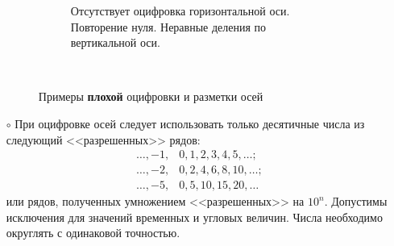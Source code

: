 \begin{itemize}
\begin{figure}
\begin{subfigure}[t]{0.46\tw}
        \caption{Отсутствует оцифровка горизонтальной оси. Повторение нуля. Неравные деления по вертикальной оси.}
    \end{subfigure}
    \hfill\!\!\!~
    \caption{Примеры {\bfseries плохой} оцифровки и разметки осей}
\end{figure}
    
    \item[$\circ$] При оцифровке осей следует использовать только десятичные числа из следующий <<разрешенных>> рядов:
    \begin{align*}
        \ldots,-1,&0,1,2,3,4,5,\ldots;\\
        \ldots,-2,&0,2,4,6,8,10,\ldots;\\
        \ldots,-5,&0,5,10,15,20,\ldots
    \end{align*}
    или рядов, полученных умножением <<разрешенных>> на $10^n$. Допустимы исключения для значений временных и угловых величин. Числа необходимо округлять с одинаковой точностью.
    
\begin{figure}
    \hfill
    \begin{subfigure}[t]{0.46\tw}
        \centering
\end{subfigure}
\end{figure}
\end{itemize}
